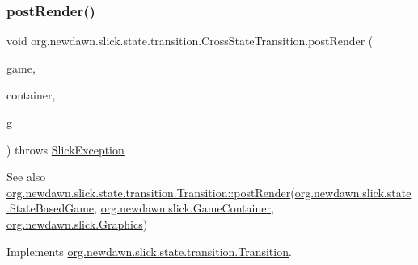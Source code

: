 \subsubsection{\texorpdfstring{post\+Render()}{postRender()}}
{\footnotesize\ttfamily void org.\+newdawn.\+slick.\+state.\+transition.\+Cross\+State\+Transition.\+post\+Render (\begin{DoxyParamCaption}\item[{\mbox{\hyperlink{classorg_1_1newdawn_1_1slick_1_1state_1_1_state_based_game}{State\+Based\+Game}}}]{game,  }\item[{\mbox{\hyperlink{classorg_1_1newdawn_1_1slick_1_1_game_container}{Game\+Container}}}]{container,  }\item[{\mbox{\hyperlink{classorg_1_1newdawn_1_1slick_1_1_graphics}{Graphics}}}]{g }\end{DoxyParamCaption}) throws \mbox{\hyperlink{classorg_1_1newdawn_1_1slick_1_1_slick_exception}{Slick\+Exception}}\hspace{0.3cm}{\ttfamily [inline]}}

\begin{DoxySeeAlso}{See also}
\mbox{\hyperlink{interfaceorg_1_1newdawn_1_1slick_1_1state_1_1transition_1_1_transition_ac113f4d5a19962a62a8adec7f9ab5d47}{org.\+newdawn.\+slick.\+state.\+transition.\+Transition\+::post\+Render}}(\mbox{\hyperlink{classorg_1_1newdawn_1_1slick_1_1state_1_1_state_based_game}{org.\+newdawn.\+slick.\+state.\+State\+Based\+Game}}, \mbox{\hyperlink{classorg_1_1newdawn_1_1slick_1_1_game_container}{org.\+newdawn.\+slick.\+Game\+Container}}, \mbox{\hyperlink{classorg_1_1newdawn_1_1slick_1_1_graphics}{org.\+newdawn.\+slick.\+Graphics}}) 
\end{DoxySeeAlso}


Implements \mbox{\hyperlink{interfaceorg_1_1newdawn_1_1slick_1_1state_1_1transition_1_1_transition_ac113f4d5a19962a62a8adec7f9ab5d47}{org.\+newdawn.\+slick.\+state.\+transition.\+Transition}}.


